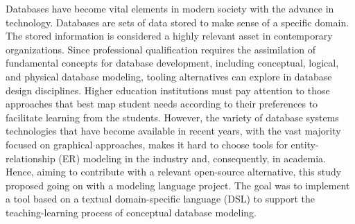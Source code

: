 \begin{resumo}[Abstract]
Databases have become vital elements in modern society with the advance in technology.
Databases are sets of data stored to make sense of a specific domain.
The stored information is considered a highly relevant asset in contemporary organizations.
Since professional qualification requires the assimilation of fundamental concepts for database development, including conceptual, logical, and physical database modeling, tooling alternatives can explore in database design disciplines. 
Higher education institutions must pay attention to those approaches that best map student needs according to their preferences to facilitate learning from the students.
However, the variety of database systems technologies that have become available in recent years, with the vast majority focused on graphical approaches, makes it hard to choose tools for entity-relationship (ER) modeling in the industry and, consequently, in academia.
Hence, aiming to contribute with a relevant open-source alternative, this study proposed going on with a modeling language project.
The goal was to implement a tool based on a textual domain-specific language (DSL) to support the teaching-learning process of conceptual database modeling.

\end{resumo}
